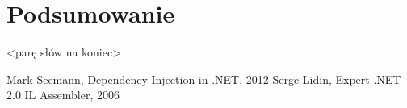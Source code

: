\documentclass[12pt]{article}
\begin{document}
\clearpage

\section{Podsumowanie}
<parę słów na koniec>

\newpage
\begin{thebibliography}{authordate1}
 Mark Seemann, Dependency Injection in .NET, 2012
 Serge Lidin, Expert .NET 2.0 IL Assembler, 2006
\end{thebibliography}
\end{document}
